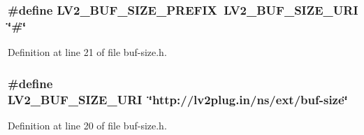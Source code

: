 \subsubsection[{\texorpdfstring{L\+V2\+\_\+\+B\+U\+F\+\_\+\+S\+I\+Z\+E\+\_\+\+P\+R\+E\+F\+IX}{LV2_BUF_SIZE_PREFIX}}]{\setlength{\rightskip}{0pt plus 5cm}\#define L\+V2\+\_\+\+B\+U\+F\+\_\+\+S\+I\+Z\+E\+\_\+\+P\+R\+E\+F\+IX~{\bf L\+V2\+\_\+\+B\+U\+F\+\_\+\+S\+I\+Z\+E\+\_\+\+U\+RI} \char`\"{}\#\char`\"{}}\hypertarget{buf-size_8h_a64096fada3412e9a580cc070d6dfba9b}{}\label{buf-size_8h_a64096fada3412e9a580cc070d6dfba9b}


Definition at line 21 of file buf-\/size.\+h.

\subsubsection[{\texorpdfstring{L\+V2\+\_\+\+B\+U\+F\+\_\+\+S\+I\+Z\+E\+\_\+\+U\+RI}{LV2_BUF_SIZE_URI}}]{\setlength{\rightskip}{0pt plus 5cm}\#define L\+V2\+\_\+\+B\+U\+F\+\_\+\+S\+I\+Z\+E\+\_\+\+U\+RI~\char`\"{}http\+://{\bf lv2plug.\+in}/{\bf ns}/ext/{\bf buf}-\/{\bf size}\char`\"{}}\hypertarget{buf-size_8h_a3a700d933b794162ea2a9c439d7f69ae}{}\label{buf-size_8h_a3a700d933b794162ea2a9c439d7f69ae}


Definition at line 20 of file buf-\/size.\+h.

